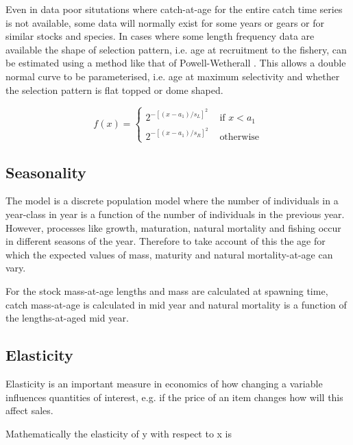 \documentclass[10pt]{article}
\begin{document}
\begin{description}
Even in data poor situtations where catch-at-age for the entire catch time series is not available, some data will normally exist for 
some years or gears or for similar stocks and species. In cases where some length frequency data are available the shape of selection pattern, i.e.
age at recruitment to the fishery, can be estimated using a method like that of Powell-Wetherall \cite{wetherall1987estimating}. This allows
a double normal curve to be parameterised, i.e. age at maximum selectivity and whether the selection pattern is flat topped or dome shaped.



\begin{equation}
f(x) = \left\{ \begin{array}{rl}
 2^{-[(x-a_1)/s_L]^2} &\mbox{ if $x<a_1$} \\
 2^{-[(x-a_1)/s_R]^2} &\mbox{ otherwise}
       \end{array} \right.
\end{equation}
 

\end{description}


\subsection{Seasonality}

The model is a discrete population model where the number of individuals in a year-class in year is a function of the number of individuals in the previous year.
However, processes like growth, maturation, natural mortality and fishing occur in different seasons of the year. Therefore to take account of this the age for which
the expected values of mass, maturity and natural mortality-at-age can vary. 

For the stock mass-at-age lengths and mass are calculated at spawning time, catch mass-at-age is calculated in mid year and natural mortality is a function of the lengths-at-aged 
mid year.  

\subsection{Elasticity}

Elasticity is an important measure in economics of how changing a variable influences quantities of interest, e.g. if the price of an item 
changes how will this affect sales.
 
Mathematically the elasticity of y with respect to x is 
\end{document}

